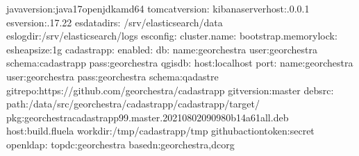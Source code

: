 \documentclass[letterpaper,10pt,french]{sphinxmanual}
\begin{document}
\begin{sphinxVerbatim}[commandchars=\\\{\}]
java\PYGZus{}version:java\PYGZhy{}17\PYGZhy{}openjdk\PYGZhy{}amd64
tomcat\PYGZus{}version:
kibana\PYGZus{}server\PYGZus{}host:.0.0.1
es\PYGZus{}version:.17.22
es\PYGZus{}data\PYGZus{}dirs:
\PYGZhy{}/srv/elasticsearch/data
es\PYGZus{}log\PYGZus{}dir:/srv/elasticsearch/logs
es\PYGZus{}config:
cluster.name:
bootstrap.memory\PYGZus{}lock:
es\PYGZus{}heap\PYGZus{}size:1g
cadastrapp:
enabled:
db:
name:georchestra
user:georchestra
schema:cadastrapp
pass:georchestra
qgisdb:
host:localhost
port:
name:georchestra
user:georchestra
pass:georchestra
schema:qadastre
gitrepo:https://github.com/georchestra/cadastrapp
gitversion:master
debsrc:
path:/data/src/georchestra/cadastrapp/cadastrapp/target/
pkg:georchestra\PYGZhy{}cadastrapp\PYGZus{}99.master.202108020909\PYGZti{}80b14a6\PYGZhy{}1\PYGZus{}all.deb
host:build.fluela
workdir:/tmp/cadastrapp/tmp
github\PYGZus{}action\PYGZus{}token:secret
openldap:
topdc:georchestra
basedn:georchestra,dcorg

\end{sphinxVerbatim}
\end{document}
